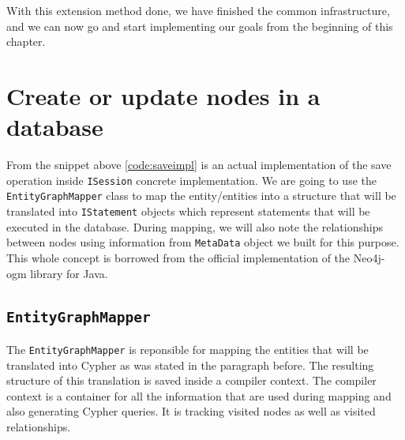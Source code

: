 With this extension method done, we have finished the common infrastructure, and we can now go and start implementing our
goals from the beginning of this chapter.

\section{Create or update nodes in a database}


From the snippet above \ref{code:saveimpl} is an actual implementation of the save operation inside \texttt{ISession} concrete implementation.
We are going to use the \texttt{EntityGraphMapper} class to map the entity/entities into a structure that will be translated into
\texttt{IStatement} objects which represent statements that will be executed in the database. During mapping, we will also note the relationships between nodes
using information from \texttt{MetaData} object we built for this purpose. This whole concept is borrowed from
the official implementation of the Neo4j-\acrshort{ogm} library for Java.

\subsection{\texttt{EntityGraphMapper}}

The \texttt{EntityGraphMapper} is reponsible for mapping the entities that will be translated into Cypher as was stated in the paragraph before.
The resulting structure of this translation is saved inside a compiler context. The compiler context is a container for all the information
that are used during mapping and also generating Cypher queries. It is tracking visited nodes as well as visited relationships.


